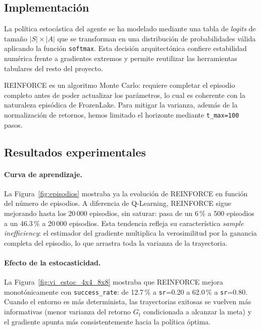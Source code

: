 \documentclass[11pt,a4paper]{article}
\begin{document}
\subsection{Implementación}

La política estocástica del agente se ha modelado mediante una tabla de \emph{logits} de tamaño $|S|\times |A|$ que se transforman en una distribución de probabilidades válida aplicando la función \texttt{softmax}. Esta decisión arquitectónica confiere estabilidad numérica frente a gradientes extremos y permite reutilizar las herramientas tabulares del resto del proyecto.

REINFORCE es un algoritmo Monte Carlo: requiere completar el episodio completo antes de poder actualizar los parámetros, lo cual es coherente con la naturaleza episódica de FrozenLake. Para mitigar la varianza, además de la normalización de retornos, hemos limitado el horizonte mediante \texttt{t\_max=100} pasos.

\subsection{Resultados experimentales}

\paragraph{Curva de aprendizaje.} La Figura~\ref{fig:episodios} mostraba ya la evolución de REINFORCE en función del número de episodios. A diferencia de Q-Learning, REINFORCE sigue mejorando hasta los 20\,000 episodios, sin saturar: pasa de un 6\,\% a 500 episodios a un 46.3\,\% a 20\,000 episodios. Esta tendencia refleja su característica \emph{sample inefficiency}: el estimador del gradiente multiplica la verosimilitud por la ganancia completa del episodio, lo que arrastra toda la varianza de la trayectoria.

\paragraph{Efecto de la estocasticidad.} La Figura~\ref{fig:vi_estoc_4x4_8x8} mostraba que REINFORCE mejora monotónicamente con \texttt{success\_rate}: de 12.7\,\% a \texttt{sr}=0.20 a 62.0\,\% a \texttt{sr}=0.80. Cuando el entorno es más determinista, las trayectorias exitosas se vuelven más informativas (menor varianza del retorno $G_t$ condicionada a alcanzar la meta) y el gradiente apunta más consistentemente hacia la política óptima.
\end{document}
